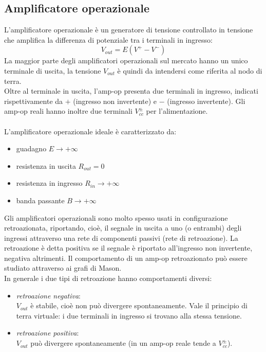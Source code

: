 \documentclass{article}
\begin{document}
\subsection{Amplificatore operazionale}
L'amplificatore operazionale è un generatore di tensione controllato in tensione che amplifica la differenza di potenziale tra i terminali in ingresso:
$$ V_{out}=E(V^+-V^-) $$
La maggior parte degli amplificatori operazionali sul mercato hanno un unico terminale di uscita, la tensione $V_{out}$ è quindi da intendersi come riferita al nodo di terra.\\
Oltre al terminale in uscita, l'amp-op presenta due terminali in ingresso, indicati rispettivamente da $+$ (ingresso non invertente) e $-$ (ingresso invertente). Gli amp-op reali hanno inoltre due terminali $V_{cc}^\pm$ per l'alimentazione.\\\\
L'amplificatore operazionale ideale è caratterizzato da:
\begin{itemize}
    \item guadagno $E\rightarrow+\infty$
    \item resistenza in uscita $R_{out}=0$
    \item resistenza in ingresso $R_{in}\rightarrow+\infty$
    \item banda passante $B\rightarrow+\infty$
\end{itemize}
Gli amplificatori operazionali sono molto spesso usati in configurazione retroazionata, riportando, cioè, il segnale in uscita a uno (o entrambi) degli ingressi attraverso una rete di componenti passivi (rete di retroazione). La retroazione è detta positiva se il segnale è riportato all'ingresso non invertente, negativa altrimenti. Il comportamento di un amp-op retroazionato può essere studiato attraverso ai grafi di Mason.\\
In generale i due tipi di retroazione hanno comportamenti diversi:
\begin{itemize}
    \item \textit{retroazione negativa}:\\
    $V_{out}$ è stabile, cioè non può divergere spontaneamente. Vale il principio di terra virtuale: i due terminali in ingresso si trovano alla stessa tensione.

    \item \textit{retroazione positiva}:\\
    $V_{out}$ può divergere spontaneamente (in un amp-op reale tende a $V_{cc}^\pm$).
    
\end{itemize}
\end{document}
